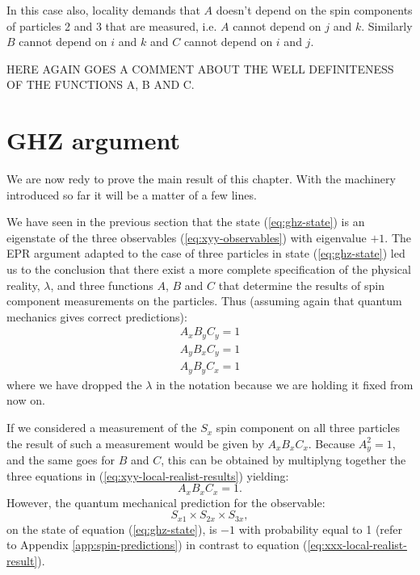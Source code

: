 In this case also, locality demands that $A$ doesn't depend on the spin components of particles 2 and 3 that are measured, i.e. $A$ cannot depend on $j$ and $k$. Similarly $B$ cannot depend on $i$ and $k$ and $C$ cannot depend on $i$ and $j$.

\begin{observation}
  HERE AGAIN GOES A COMMENT ABOUT THE WELL DEFINITENESS OF THE FUNCTIONS A, B AND C.
\end{observation}


\section{GHZ argument}
We are now redy to prove the main result of this chapter. With the machinery introduced so far it will be a matter of a few lines.

We have seen in the previous section that the state (\ref{eq:ghz-state}) is an eigenstate of the three observables (\ref{eq:xyy-observables}) with eigenvalue $+ 1$. The EPR argument adapted to the case of three particles in state (\ref{eq:ghz-state}) led us to the conclusion that there exist a more complete specification of the physical reality, $\lambda$, and three functions $A$, $B$ and $C$ that determine the results of spin component measurements on the particles. Thus (assuming again that quantum mechanics gives correct predictions):%
\begin{equation}
  \begin{split}
    A_x B_y C_y = 1\\
    A_y B_x C_y = 1\\
    A_y B_y C_x = 1
  \end{split}
  \label{eq:xyy-local-realist-results}
\end{equation}
where we have dropped the $\lambda$ in the notation because we are holding it fixed from now on.

If we considered a measurement of the $S_x$ spin component on all three particles the result of such a measurement would be given by $A_x B_x C_x$. Because $A_y^2 = 1$, and the same goes for $B$ and $C$, this can be obtained by multiplyng together the three equations in (\ref{eq:xyy-local-realist-results}) yielding:
\begin{equation}
  A_x B_x C_x = 1.
  \label{eq:xxx-local-realist-result}
\end{equation}
However, the quantum mechanical prediction for the observable:
\begin{equation}
  S_{x1} \times S_{2x} \times S_{3x},
  \label{eq:xxx-observable}
\end{equation}
on the state of equation (\ref{eq:ghz-state}), is $- 1$ with probability equal to 1 (refer to Appendix \ref{app:spin-predictions}) in contrast to equation (\ref{eq:xxx-local-realist-result}).


